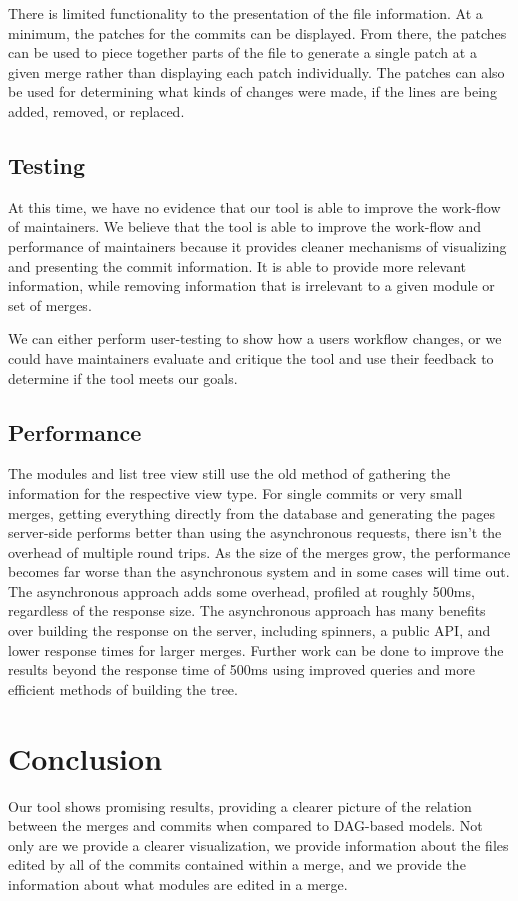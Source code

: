 \documentclass[conference, draftclsnofoot]{IEEEtran}
\begin{document}
There is limited functionality to the presentation of the file information. At
a minimum, the patches for the commits can be displayed. From there, the
patches can be used to piece together parts of the file to generate a single
patch at a given merge rather than displaying each patch individually. The
patches can also be used for determining what kinds of changes were made, if
the lines are being added, removed, or replaced.

\subsection{Testing}
At this time, we have no evidence that our tool is able to improve the
work-flow of maintainers. We believe that the tool is able to improve the
work-flow and performance of maintainers because it provides cleaner mechanisms
of visualizing and presenting the commit information. It is able to provide
more relevant information, while removing information that is irrelevant to a
given module or set of merges.

We can either perform user-testing to show how a users workflow changes, or we
could have maintainers evaluate and critique the tool and use their feedback to
determine if the tool meets our goals.

\subsection{Performance}
The modules and list tree view still use the old method of gathering the
information for the respective view type. For single commits or very small
merges, getting everything directly from the database and generating the pages
server-side performs better than using the asynchronous requests, there
isn't the overhead of multiple round trips. As the size of the merges grow,
the performance becomes far worse than the asynchronous system and in some
cases will time out. The asynchronous approach adds some overhead, profiled at
roughly 500ms, regardless of the response size. The asynchronous approach has
many benefits over building the response on the server, including spinners, a
public API, and lower response times for larger merges. Further work can be
done to improve the results beyond the response time of 500ms using improved
queries and more efficient methods of building the tree.

\section{Conclusion}
Our tool shows promising results, providing a clearer picture of the relation
between the merges and commits when compared to DAG-based models. Not only are
we provide a clearer visualization, we provide information about the files
edited by all of the commits contained within a merge, and we provide the
information about what modules are edited in a merge.
\end{document}
